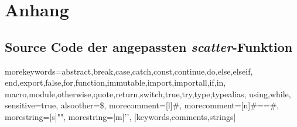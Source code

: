 \chapter{Anhang}

\section{Source Code der angepassten \textit{scatter}-Funktion} \label{scatter_source}

%
  {morekeywords={abstract,break,case,catch,const,continue,do,else,elseif,%
      end,export,false,for,function,immutable,import,importall,if,in,%
      macro,module,otherwise,quote,return,switch,true,try,type,typealias,%
      using,while},%
   sensitive=true,%
   alsoother={\$},%
   morecomment=[l]#,%
   morecomment=[n]{#=}{=#},%
   morestring=[s]{"}{"},%
   morestring=[m]{'}{'},%
}[keywords,comments,strings]%


